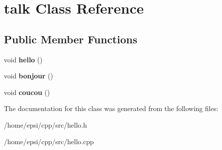 \hypertarget{classtalk}{}\section{talk Class Reference}
\label{classtalk}
\subsection*{Public Member Functions}
\begin{DoxyCompactItemize}
\item 
\mbox{\label{classtalk_ae585e254fa9691c052905f01cb317140}} 
void {\bfseries hello} ()
\item 
\mbox{\label{classtalk_a145c78c9234337d971349ccebb05ce1d}} 
void {\bfseries bonjour} ()
\item 
\mbox{\label{classtalk_a6fe7ba0eff460fcc75bd94d353d52bb8}} 
void {\bfseries coucou} ()
\end{DoxyCompactItemize}


The documentation for this class was generated from the following files\+:\begin{DoxyCompactItemize}
\item 
/home/epsi/cpp/src/hello.\+h\item 
/home/epsi/cpp/src/hello.\+cpp\end{DoxyCompactItemize}
